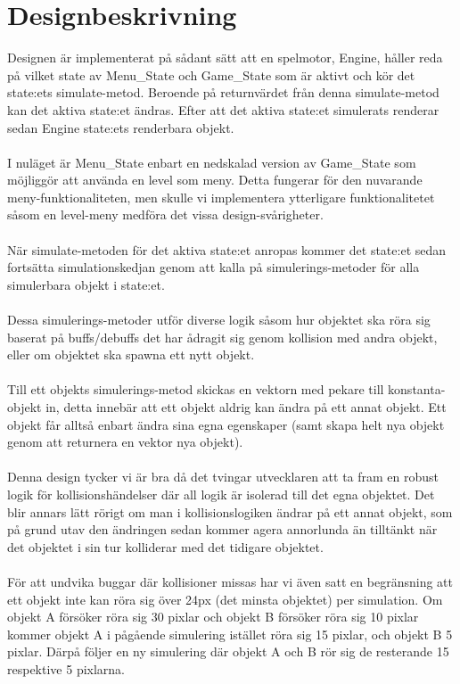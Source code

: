 \documentclass{TDP003mall}
\begin{document}
\section{Designbeskrivning}
Designen är implementerat på sådant sätt att en spelmotor, Engine, håller reda på vilket state av Menu\_State och Game\_State som är aktivt och kör det state:ets simulate-metod. Beroende på returnvärdet från denna simulate-metod kan det aktiva state:et ändras. Efter att det aktiva state:et simulerats renderar sedan Engine state:ets renderbara objekt.
\\\\
I nuläget är Menu\_State enbart en nedskalad version av Game\_State som möjliggör att använda en level som meny. Detta fungerar för den nuvarande meny-funktionaliteten, men skulle vi implementera ytterligare funktionalitetet såsom en level-meny medföra det vissa design-svårigheter.
\\\\
När simulate-metoden för det aktiva state:et anropas kommer det state:et sedan fortsätta simulationskedjan genom att kalla på simulerings-metoder för alla simulerbara objekt i state:et.
\\\\
Dessa simulerings-metoder utför diverse logik såsom hur objektet ska röra sig baserat på buffs/debuffs det har ådragit sig genom kollision med andra objekt, eller om objektet ska spawna ett nytt objekt.
\\\\
Till ett objekts simulerings-metod skickas en vektorn med pekare till konstanta-objekt in, detta innebär att ett objekt aldrig kan ändra på ett annat objekt. Ett objekt får alltså enbart ändra sina egna egenskaper (samt skapa helt nya objekt genom att returnera en vektor nya objekt).
\\\\
Denna design tycker vi är bra då det tvingar utvecklaren att ta fram en robust logik för kollisionshändelser där all logik är isolerad till det egna objektet. Det blir annars lätt rörigt om man i kollisionslogiken ändrar på ett annat objekt, som på grund utav den ändringen sedan kommer agera annorlunda än tilltänkt när det objektet i sin tur kolliderar med det tidigare objektet.
\\\\
För att undvika buggar där kollisioner missas har vi även satt en begränsning att ett objekt inte kan röra sig över 24px (det minsta objektet) per simulation. Om objekt A försöker röra sig 30 pixlar och objekt B försöker röra sig 10 pixlar kommer objekt A i pågående simulering istället röra sig 15 pixlar, och objekt B 5 pixlar. Därpå följer en ny simulering där objekt A och B rör sig de resterande 15 respektive 5 pixlarna.
\end{document}

